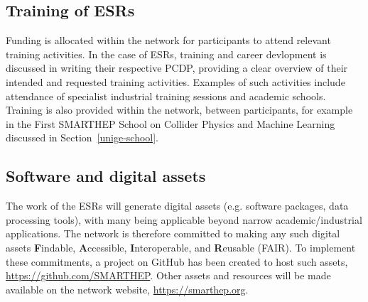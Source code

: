\subsection{Training of ESRs}
\label{training}
Funding is allocated within the network for participants to attend relevant training activities. In the case of ESRs, training and career devlopment is discussed in writing their respective PCDP, providing a clear overview of their intended and requested training activities. Examples of such activities include attendance of specialist industrial training sessions and academic schools. Training is also provided within the network, between participants, for example in the First SMARTHEP School on Collider Physics and Machine Learning discussed in Section~\ref{unige-school}.

\subsection{Software and digital assets}
\label{software}
The work of the ESRs will generate digital assets (e.g. software packages, data processing tools), with many being applicable beyond narrow academic/industrial applications. The network is therefore committed to making any such digital assets \textbf{F}indable, \textbf{A}ccessible, \textbf{I}nteroperable, and \textbf{R}eusable (FAIR). \cite{FAIR-principles} To implement these commitments, a project on GitHub has been created to host such assets, \url{https://github.com/SMARTHEP}. Other assets and resources will be made available on the network website, \url{https://smarthep.org}.
